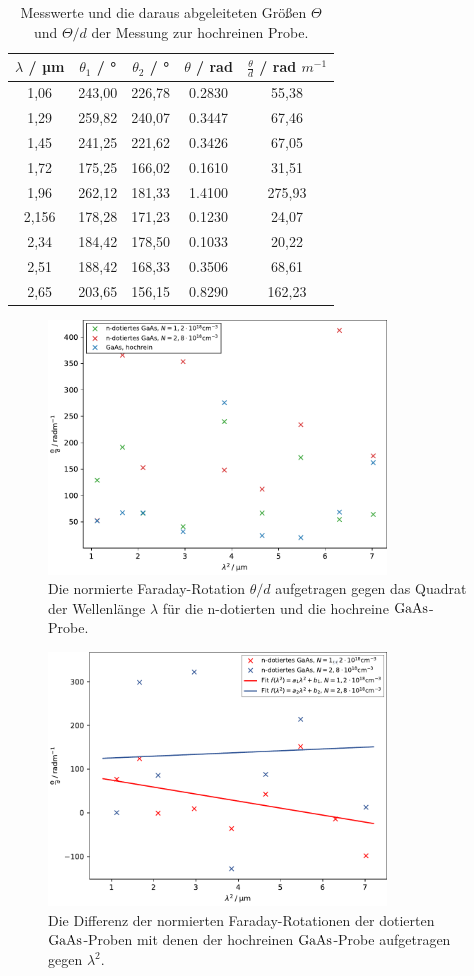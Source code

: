 \begin{table}[h]
  \centering
  \caption{Messwerte und die daraus abgeleiteten Größen $\Theta$ und $\Theta/d$ der Messung zur hochreinen Probe.}
  \label{tab:probe3}
  \begin{tabular}{S[table-format=1.1] S S S S}
    {$\lambda$ / µm} & {$\theta_1$ / °} & {$\theta_2$ / °} & {$\theta$ / rad} & {$\frac{\theta}{d}$ / rad $m^{-1}$}\\
    ,06 &  243,00 &  226,78 & 0.2830 & 55,38\\
    1,29 &  259,82 &  240,07 & 0.3447 & 67,46\\
    1,45 &  241,25 &  221,62 & 0.3426 & 67,05\\
    1,72 &  175,25 &  166,02 & 0.1610 & 31,51\\
    1,96 &  262,12 &  181,33 & 1.4100 & 275,93\\
    2,156 & 178,28 &  171,23 & 0.1230 & 24,07\\
    2,34 & 184,42 &  178,50 & 0.1033 & 20,22\\
    2,51 & 188,42 &  168,33 & 0.3506 & 68,61\\
    2,65 & 203,65 &  156,15 & 0.8290 & 162,23\\
  \end{tabular}
\end{table}
\clearpage
\begin{figure}[H]
  \centering
  \includegraphics[width=0.8\textwidth]{plots/GaAs.pdf}
  \caption{Die normierte Faraday-Rotation $\theta/d$ aufgetragen gegen das Quadrat der Wellenlänge $\lambda$ für die n-dotierten und die hochreine $\ce{GaAs}$-Probe.}
  \label{GaAs1}
\end{figure}

\begin{figure}[H]
  \centering
  \includegraphics[width=0.8\textwidth]{plots/GaAs2.pdf}
  \caption{Die Differenz der normierten Faraday-Rotationen der dotierten $\ce{GaAs}$-Proben mit denen der hochreinen $\ce{GaAs}$-Probe aufgetragen gegen $\lambda^2$.}
  \label{GaAs2}
\end{figure}
\clearpage
